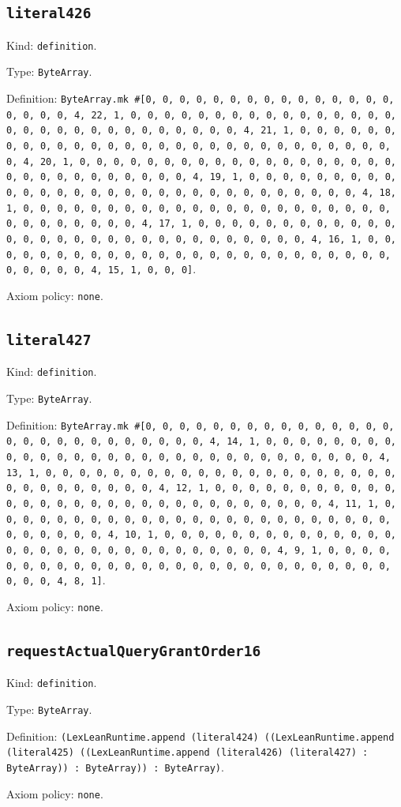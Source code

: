 \documentclass[11pt]{article}
\begin{document}
\subsection*{\texttt{literal426}}
\noindent Kind: \texttt{definition}.\par
\noindent Type: \texttt{ByteArray}.\par
\noindent Definition: \texttt{ByteArray.mk \#[0, 0, 0, 0, 0, 0, 0, 0, 0, 0, 0, 0, 0, 0, 0, 0, 0, 0, 0, 4, 22, 1, 0, 0, 0, 0, 0, 0, 0, 0, 0, 0, 0, 0, 0, 0, 0, 0, 0, 0, 0, 0, 0, 0, 0, 0, 0, 0, 0, 0, 0, 0, 4, 21, 1, 0, 0, 0, 0, 0, 0, 0, 0, 0, 0, 0, 0, 0, 0, 0, 0, 0, 0, 0, 0, 0, 0, 0, 0, 0, 0, 0, 0, 0, 0, 4, 20, 1, 0, 0, 0, 0, 0, 0, 0, 0, 0, 0, 0, 0, 0, 0, 0, 0, 0, 0, 0, 0, 0, 0, 0, 0, 0, 0, 0, 0, 0, 0, 4, 19, 1, 0, 0, 0, 0, 0, 0, 0, 0, 0, 0, 0, 0, 0, 0, 0, 0, 0, 0, 0, 0, 0, 0, 0, 0, 0, 0, 0, 0, 0, 0, 4, 18, 1, 0, 0, 0, 0, 0, 0, 0, 0, 0, 0, 0, 0, 0, 0, 0, 0, 0, 0, 0, 0, 0, 0, 0, 0, 0, 0, 0, 0, 0, 0, 4, 17, 1, 0, 0, 0, 0, 0, 0, 0, 0, 0, 0, 0, 0, 0, 0, 0, 0, 0, 0, 0, 0, 0, 0, 0, 0, 0, 0, 0, 0, 0, 0, 4, 16, 1, 0, 0, 0, 0, 0, 0, 0, 0, 0, 0, 0, 0, 0, 0, 0, 0, 0, 0, 0, 0, 0, 0, 0, 0, 0, 0, 0, 0, 0, 0, 4, 15, 1, 0, 0, 0]}.\par
\noindent Axiom policy: \texttt{none}.\par
\subsection*{\texttt{literal427}}
\noindent Kind: \texttt{definition}.\par
\noindent Type: \texttt{ByteArray}.\par
\noindent Definition: \texttt{ByteArray.mk \#[0, 0, 0, 0, 0, 0, 0, 0, 0, 0, 0, 0, 0, 0, 0, 0, 0, 0, 0, 0, 0, 0, 0, 0, 0, 0, 0, 4, 14, 1, 0, 0, 0, 0, 0, 0, 0, 0, 0, 0, 0, 0, 0, 0, 0, 0, 0, 0, 0, 0, 0, 0, 0, 0, 0, 0, 0, 0, 0, 0, 4, 13, 1, 0, 0, 0, 0, 0, 0, 0, 0, 0, 0, 0, 0, 0, 0, 0, 0, 0, 0, 0, 0, 0, 0, 0, 0, 0, 0, 0, 0, 0, 0, 4, 12, 1, 0, 0, 0, 0, 0, 0, 0, 0, 0, 0, 0, 0, 0, 0, 0, 0, 0, 0, 0, 0, 0, 0, 0, 0, 0, 0, 0, 0, 0, 0, 4, 11, 1, 0, 0, 0, 0, 0, 0, 0, 0, 0, 0, 0, 0, 0, 0, 0, 0, 0, 0, 0, 0, 0, 0, 0, 0, 0, 0, 0, 0, 0, 0, 4, 10, 1, 0, 0, 0, 0, 0, 0, 0, 0, 0, 0, 0, 0, 0, 0, 0, 0, 0, 0, 0, 0, 0, 0, 0, 0, 0, 0, 0, 0, 0, 0, 4, 9, 1, 0, 0, 0, 0, 0, 0, 0, 0, 0, 0, 0, 0, 0, 0, 0, 0, 0, 0, 0, 0, 0, 0, 0, 0, 0, 0, 0, 0, 0, 0, 4, 8, 1]}.\par
\noindent Axiom policy: \texttt{none}.\par
\subsection*{\texttt{requestActualQueryGrantOrder16}}
\noindent Kind: \texttt{definition}.\par
\noindent Type: \texttt{ByteArray}.\par
\noindent Definition: \texttt{(LexLeanRuntime.append (literal424) ((LexLeanRuntime.append (literal425) ((LexLeanRuntime.append (literal426) (literal427) : ByteArray)) : ByteArray)) : ByteArray)}.\par
\noindent Axiom policy: \texttt{none}.\par
\end{document}
